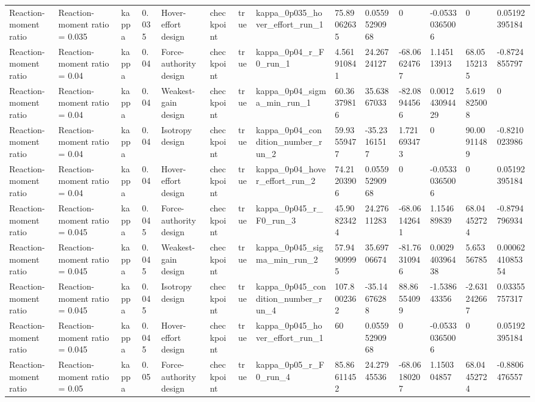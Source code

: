 \begin{tabular}{@{}llllllllllllll@{}}
Reaction-moment ratio & Reaction-moment ratio = 0.035 & kappa & 0.035 & Hover-effort design & checkpoint & true & kappa\_0p035\_hover\_effort\_run\_1 & 75.89062635 & 0.05595290968 & 0 & -0.05330365006 & 0 & 0.05192395184 \\
Reaction-moment ratio & Reaction-moment ratio = 0.04 & kappa & 0.04 & Force-authority design & checkpoint & true & kappa\_0p04\_r\_F0\_run\_1 & 4.561910841 & 24.26724127 & -68.06624767 & 1.145113913 & 68.05152135 & -0.8724855797 \\
Reaction-moment ratio & Reaction-moment ratio = 0.04 & kappa & 0.04 & Weakest-gain design & checkpoint & true & kappa\_0p04\_sigma\_min\_run\_1 & 60.36379816 & 35.63867033 & -82.08944566 & 0.001243094429 & 5.619825008 & 0 \\
Reaction-moment ratio & Reaction-moment ratio = 0.04 & kappa & 0.04 & Isotropy design & checkpoint & true & kappa\_0p04\_condition\_number\_run\_2 & 59.93559477 & -35.23161517 & 1.721693473 & 0 & 90.00911489 & -0.8210023986 \\
Reaction-moment ratio & Reaction-moment ratio = 0.04 & kappa & 0.04 & Hover-effort design & checkpoint & true & kappa\_0p04\_hover\_effort\_run\_2 & 74.21203906 & 0.05595290968 & 0 & -0.05330365006 & 0 & 0.05192395184 \\
Reaction-moment ratio & Reaction-moment ratio = 0.045 & kappa & 0.045 & Force-authority design & checkpoint & true & kappa\_0p045\_r\_F0\_run\_3 & 45.90823424 & 24.27611283 & -68.06142641 & 1.154689839 & 68.04452724 & -0.8794796934 \\
Reaction-moment ratio & Reaction-moment ratio = 0.045 & kappa & 0.045 & Weakest-gain design & checkpoint & true & kappa\_0p045\_sigma\_min\_run\_2 & 57.94909995 & 35.69706674 & -81.76310946 & 0.002940396438 & 5.65356785 & 0.0006241085354 \\
Reaction-moment ratio & Reaction-moment ratio = 0.045 & kappa & 0.045 & Isotropy design & checkpoint & true & kappa\_0p045\_condition\_number\_run\_4 & 107.8002362 & -35.14676288 & 88.86554099 & -1.538643356 & -2.631242667 & 0.03355757317 \\
Reaction-moment ratio & Reaction-moment ratio = 0.045 & kappa & 0.045 & Hover-effort design & checkpoint & true & kappa\_0p045\_hover\_effort\_run\_1 & 60 & 0.05595290968 & 0 & -0.05330365006 & 0 & 0.05192395184 \\
Reaction-moment ratio & Reaction-moment ratio = 0.05 & kappa & 0.05 & Force-authority design & checkpoint & true & kappa\_0p05\_r\_F0\_run\_4 & 85.86611452 & 24.27945536 & -68.06180207 & 1.150304857 & 68.04452724 & -0.8806476557 \\

\end{tabular}
